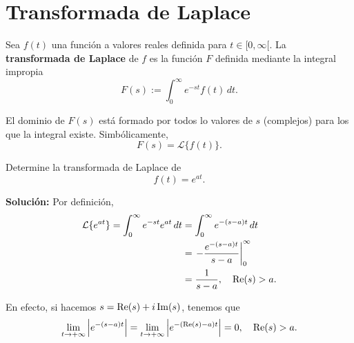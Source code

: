 





\section{Transformada de Laplace}


\begin{defi}
Sea $f(t)$ una función a valores reales definida para $t \in [0, \infty[$. La \textbf{transformada de Laplace} de $f$ es la función $F$ definida mediante la integral impropia
$$F(s) := \int_0^{\infty} e^{-st} f(t) \,dt.$$

El dominio de $F(s)$ está formado por todos lo valores de $s$ (complejos) para los que la integral existe. Simbólicamente,
$$F(s) = \mathcal{L}\{f(t)\}.$$
\end{defi}

\begin{ejemplo}
Determine la transformada de Laplace de 
$$f(t) = e^{at}.$$

\textbf{Solución:} Por definición, 
\begin{align*}
    \mathcal{L}\{e^{at}\} = \int_0^{\infty} e^{-st} e^{at} \,dt &= \int_0^{\infty} e^{-(s-a)t} \,dt \\
    &= \left. - \frac{e^{-(s-a)t}}{s-a} \right|_0^{\infty} \\
    &= \frac{1}{s-a}, \quad \operatorname{Re}(s) > a.
\end{align*}

En efecto, si hacemos $s = \operatorname{Re}(s) + i \operatorname{Im}(s)$, tenemos que
$$\lim_{t\to + \infty} \left| e^{-(s-a)t} \right| = \lim_{t\to + \infty} \left|e^{-(\operatorname{Re}(s) - a)t} \right| = 0, \quad \operatorname{Re}(s) > a. $$
\end{ejemplo}

